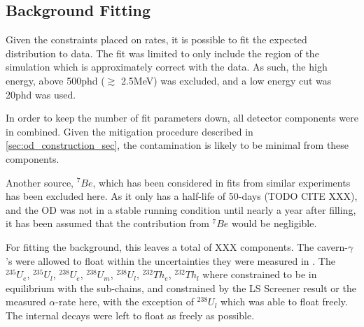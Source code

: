 \subsection{Background Fitting}
\par
Given the constraints placed on rates, it is possible to fit the expected distribution to data. 
The fit was limited to only include the region of the simulation which is approximately correct with the data. 
As such, the high energy, above 500phd ($\gtrsim$ 2.5MeV) was excluded, and a low energy cut was 20phd was used.
\par
In order to keep the number of fit parameters down, all detector components were in combined.
Given the mitigation procedure described in \autoref{sec:od_construction_sec}, the contamination is likely to be minimal from these components.
\par
Another source, ${}^{7}Be$, which has been considered in fits from similar experiments has been excluded here.
As it only has a half-life of 50-days (TODO CITE XXX), and the OD was not in a stable running condition until nearly a year after filling, it has been assumed that the contribution from ${}^{7}Be$ would be negligible.
\par
For fitting the background, this leaves a total of XXX components.
The cavern-$\gamma$'s were allowed to float within the uncertainties they were measured in \cite{LZ_Gamma_Ray_Background_ref}.
The ${}^{235}U_e$, ${}^{235}U_l$, ${}^{238}U_e$, ${}^{238}U_m$, ${}^{238}U_l$, ${}^{232}Th_e$, ${}^{232}Th_l$ where constrained to be in equilibrium with the sub-chains, and constrained by the LS Screener result or the measured $\alpha$-rate here, with the exception of ${}^{238}U_l$ which was able to float freely.
The internal decays were left to float as freely as possible.





